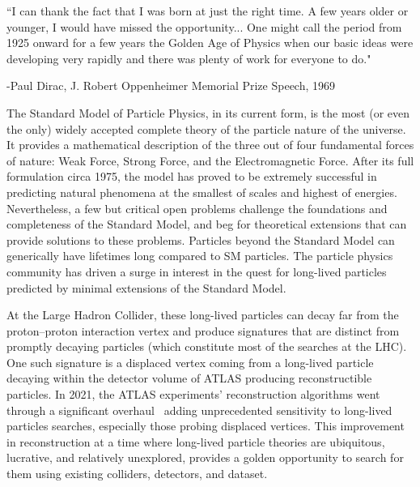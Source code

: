 \vspace{1in}
{\large
``I can thank the fact that I was born at just the right time. A few years older or younger, I would have missed the opportunity... One might call the period from 1925 onward for a few years the Golden Age of Physics when our basic ideas were developing very rapidly and there was plenty of work for everyone to do."

\hfill -Paul Dirac, J. Robert Oppenheimer Memorial Prize Speech, 1969}
\vspace{1in}

The Standard Model of Particle Physics, in its current form, is the most (or even the only) widely accepted complete theory of the particle nature of the universe. It provides a mathematical description of the three out of four fundamental forces of nature: Weak Force, Strong Force, and the Electromagnetic Force. After its full formulation circa 1975, the model has proved to be extremely successful in predicting natural phenomena at the smallest of scales and highest of energies. Nevertheless, a few but critical open problems challenge the foundations and completeness of the Standard Model, and beg for theoretical extensions that can provide solutions to these problems. Particles beyond the Standard Model can generically have lifetimes long compared to SM particles. The particle physics community has driven a surge in interest in the quest for long-lived particles~\cite{Curtin_2019, Alimena_2020} predicted by minimal extensions of the Standard Model.

At the Large Hadron Collider, these long-lived particles can decay far from the proton--proton interaction vertex and produce signatures that are distinct from promptly decaying particles (which constitute most of the searches at the LHC). One such signature is a displaced vertex coming from a long-lived particle decaying within the detector volume of ATLAS producing reconstructible particles. In 2021, the ATLAS experiments' reconstruction algorithms went through a significant overhaul~\cite{atlascollaboration2023software, IDTR-2021-03} adding unprecedented sensitivity to long-lived particles searches, especially those probing displaced vertices. This improvement in reconstruction at a time where long-lived particle theories are ubiquitous, lucrative, and relatively unexplored, provides a golden opportunity to search for them using existing colliders, detectors, and dataset.

